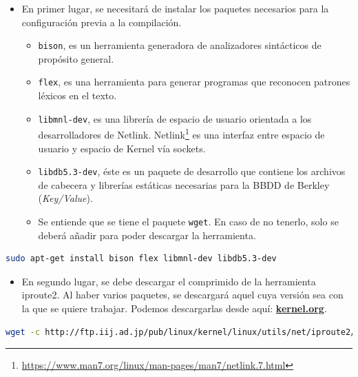 \begin{itemize}
    \item En primer lugar, se necesitará de instalar los paquetes necesarios para la configuración previa a la compilación.
    \begin{itemize}
        \item \texttt{bison}, es un herramienta generadora de analizadores sintácticos de propósito general.
       \item \texttt{flex}, es una herramienta para generar programas que reconocen patrones léxicos en el texto.
        \item \texttt{libmnl-dev}, es una librería de espacio de usuario orientada a los desarrolladores de Netlink. Netlink\footnote{\url{https://www.man7.org/linux/man-pages/man7/netlink.7.html}} es una interfaz entre espacio de usuario y espacio de Kernel vía sockets.
        
        \item \texttt{libdb5.3-dev}, éste es un paquete de desarrollo que contiene los archivos de cabecera y librerías estáticas necesarias para la BBDD de Berkley (\textit{Key/Value}).
        
        \item Se entiende que se tiene el paquete \texttt{wget}. En caso de no tenerlo, solo se deberá añadir para poder descargar la herramienta.
    \end{itemize}
\end{itemize}
\begin{lstlisting}[language= bash, style=Consola2, caption={Instalación de las dependencias de Iproute2},label=code:iproute2_deps]
   sudo apt-get install bison flex libmnl-dev libdb5.3-dev
\end{lstlisting}
\begin{itemize}
    \item En segundo lugar, se debe descargar el comprimido de la herramienta iproute2. Al haber varios paquetes, se descargará aquel cuya versión sea con la que se quiere trabajar. Podemos descargarlas desde aquí: \href{https://mirrors.edge.kernel.org/pub/linux/utils/net/iproute2/}{\textbf{kernel.org}}.
\end{itemize}
\begin{lstlisting}[language= bash, style=Consola, caption={Obtención del source de Iproute2},label=code:iproute2_src]
   wget -c http://ftp.iij.ad.jp/pub/linux/kernel/linux/utils/net/iproute2/iproute2-4.15.0.tar.gz
\end{lstlisting}

